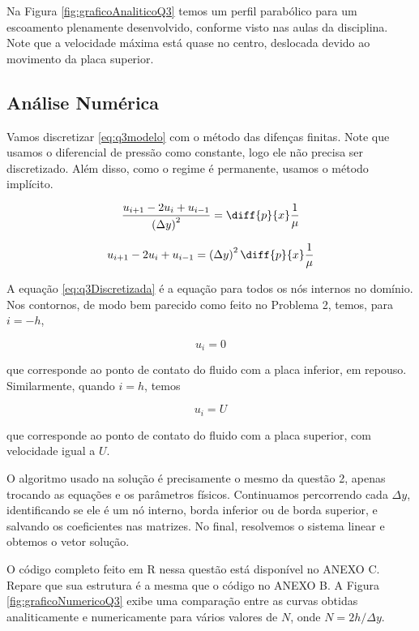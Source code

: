 Na Figura \eqref{fig:graficoAnaliticoQ3} temos um perfil parabólico para um escoamento plenamente
desenvolvido, conforme visto nas aulas da disciplina. Note que a velocidade máxima está quase no centro,
deslocada devido ao movimento da placa superior.

\subsection{Análise Numérica}

Vamos discretizar \eqref{eq:q3modelo} com o método das difenças finitas. Note que
usamos o diferencial de pressão como constante, logo ele não precisa ser discretizado.
Além disso, como o regime é permanente, usamos o método implícito.

\[ \frac{u_{i+1} - 2u_i + u_{i-1}}{\left(\Delta y\right)^2} = \diff{p}{x} \frac{1}{\mu} \]

\begin{equation}\label{eq:q3Discretizada}
    u_{i+1} - 2u_i + u_{i-1} = \left(\Delta y\right)^2\diff{p}{x} \frac{1}{\mu}
\end{equation}

A equação \eqref{eq:q3Discretizada} é a equação para todos os nós internos no domínio. Nos contornos,
de modo bem parecido como feito no Problema 2, temos, para $i = -h$,

\begin{equation}\label{eq:q3DiscContorno0}
    u_i = 0
\end{equation}

\noindent que corresponde ao ponto de contato do fluido com a placa inferior, em repouso.
Similarmente, quando $i = h$, temos 

\begin{equation}\label{eq:q3DiscContornoU}
    u_i = U
\end{equation}

\noindent que corresponde ao ponto de contato do fluido com a placa superior, com velocidade
igual a $U$.

O algoritmo usado na solução é precisamente o mesmo da questão 2, apenas trocando as equações e os parâmetros físicos.
Continuamos percorrendo cada $\Delta y$, identificando se ele é um nó interno, borda inferior ou
de borda superior, e salvando os coeficientes nas matrizes. No final, resolvemos o sistema linear 
e obtemos o vetor solução.

O código completo feito em R nessa questão está disponível no ANEXO C. Repare que sua estrutura
é a mesma que o código no ANEXO B. A Figura \ref*{fig:graficoNumericoQ3} exibe uma comparação entre
as curvas obtidas analiticamente e numericamente para vários valores de $N$, onde $N = 2h / \Delta y$.

